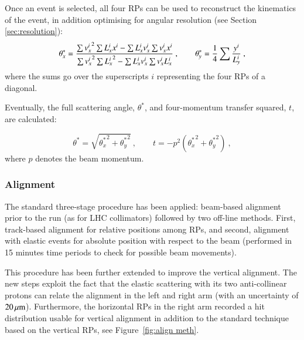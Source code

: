 Once an event is selected, all four RPs can be used to reconstruct the kinematics of the event, in addition optimising for angular resolution (see Section \ref{sec:resolution}):
\begin{equation}
\label{eq:kin 2a}
		\theta_x^* = {
				\sum {v_x^i}^2 \sum L_x^i x^i - \sum L_x^i v_x^i \sum v_x^i x^i
				\over
				\sum {v_x^i}^2 \sum {L_x^i}^2 - \sum L_x^i v_x^i \sum v_x^i L_x^i
			}\ ,\qquad
		\theta_y^* = {1\over 4} \sum {y^i\over L_y^i}\ ,
\end{equation}
where the sums go over the superscripts $i$ representing the four RPs of a diagonal.

Eventually, the full scattering angle, $\theta^*$, and four-momentum transfer squared, $t$, are calculated:

\begin{equation}
\label{eq:th t}
\theta^* = \sqrt{{\theta_x^*}^2 + {\theta_y^*}^2}\ ,\qquad t = - p^2 ({\theta_x^*}^2 + {\theta_y^*}^2)\ ,
\end{equation}
where $p$ denotes the beam momentum.



\subsubsection{Alignment}
\label{sec:alignment}

The standard three-stage procedure \cite{totem-ijmp} has been applied: beam-based alignment prior to the run (as for LHC collimators) followed by two off-line methods. First, track-based alignment for relative positions among RPs, and second, alignment with elastic events for absolute position with respect to the beam (performed in 15 minutes time periods to check for possible beam movements).

This procedure has been further extended to improve the vertical alignment. The new steps exploit the fact that the elastic scattering with its two anti-collinear protons can relate the alignment in the left and right arm (with an uncertainty of $20\,{\rm \mu m}$). Furthermore, the horizontal RPs in the right arm recorded a hit distribution usable for vertical alignment in addition to the standard technique based on the vertical RPs, see Figure~\ref{fig:align meth}.

